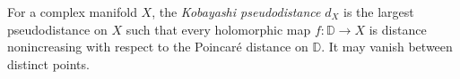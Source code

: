 
For a complex manifold $X$, the \emph{Kobayashi pseudodistance} $d_X$ is the largest pseudodistance on $X$ such that every holomorphic map $f:\mathbb D\to X$ is distance nonincreasing with respect to the Poincaré distance on $\mathbb D$. It may vanish between distinct points.
